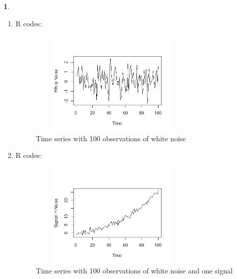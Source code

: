 \documentclass[10pt]{article}
\newtheorem{prob}{\bm{$Problem$}}
\begin{document}
\begin{prob}
\end{prob}
\begin{enumerate}[1)]
\vspace{3mm}

\item
R codes:
\begin{figure}[H]
  \centering
  \includegraphics[width=8cm,height=5cm]{p31a.jpeg}
  \caption{Time series with 100 observations of white noise}
\end{figure}
\vspace{3mm}

\item
R codes:

\begin{figure}[H]
  \centering
  \includegraphics[width=8cm,height=5cm]{p32a.jpeg}
  \caption{Time series with 100 observations of white noise and one signal}
\end{figure}

\end{enumerate}
\vspace{3mm}
\end{document}
